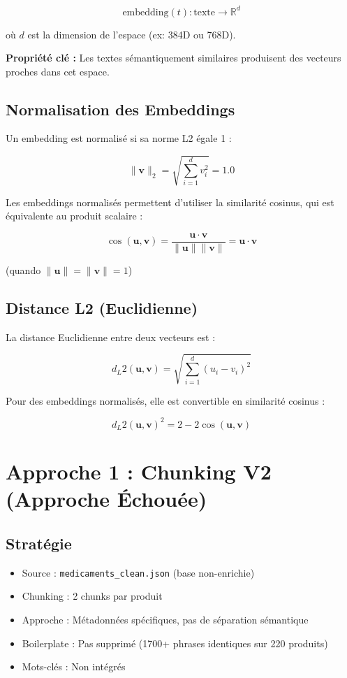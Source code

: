 \documentclass[12pt,a4paper]{article}
\begin{document}
$$\text{embedding}(t) : \text{texte} \rightarrow \mathbb{R}^d$$

où $d$ est la dimension de l'espace (ex: 384D ou 768D).

\textbf{Propriété clé :} Les textes sémantiquement similaires produisent des vecteurs proches dans cet espace.

\subsection{Normalisation des Embeddings}
Un embedding est normalisé si sa norme L2 égale 1 :

$$\|\mathbf{v}\|_2 = \sqrt{\sum_{i=1}^{d} v_i^2} = 1.0$$

Les embeddings normalisés permettent d'utiliser la similarité cosinus, qui est équivalente au produit scalaire :

$$\cos(\mathbf{u}, \mathbf{v}) = \frac{\mathbf{u} \cdot \mathbf{v}}{\|\mathbf{u}\| \|\mathbf{v}\|} = \mathbf{u} \cdot \mathbf{v}$$

(quando $\|\mathbf{u}\| = \|\mathbf{v}\| = 1$)

\subsection{Distance L2 (Euclidienne)}
La distance Euclidienne entre deux vecteurs est :

$$d_L2(\mathbf{u}, \mathbf{v}) = \sqrt{\sum_{i=1}^{d} (u_i - v_i)^2}$$

Pour des embeddings normalisés, elle est convertible en similarité cosinus :

$$d_L2(\mathbf{u}, \mathbf{v})^2 = 2 - 2\cos(\mathbf{u}, \mathbf{v})$$

\section{Approche 1 : Chunking V2 (Approche Échouée)}

\subsection{Stratégie}
\begin{itemize}
    \item Source : \texttt{medicaments\_clean.json} (base non-enrichie)
    \item Chunking : 2 chunks par produit
    \item Approche : Métadonnées spécifiques, pas de séparation sémantique
    \item Boilerplate : Pas supprimé (1700+ phrases identiques sur 220 produits)
    \item Mots-clés : Non intégrés
\end{itemize}
\end{document}
